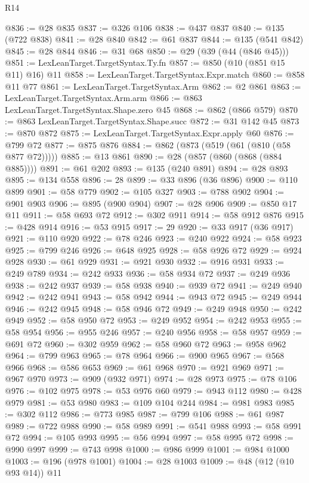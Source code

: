 \begin{lexlean}{R14}
\begin{coremodule}
@836 := @28 @835
@837 := @326 @106
@838 := @437 @837
@840 := @135 (@722 @838)
@841 := @28 @840
@842 := @61 @837
@844 := @135 (@541 @842)
@845 := @28 @844
@846 := @31 @68
@850 := @29 (@39 (@44 (@846 @45)))
@851 := LexLeanTarget.TargetSyntax.Ty.fn
@857 := @850 (@10 (@851 @15 @11) @16) @11
@858 := LexLeanTarget.TargetSyntax.Expr.match
@860 := @858 @11 @77
@861 := LexLeanTarget.TargetSyntax.Arm
@862 := @2 @861
@863 := LexLeanTarget.TargetSyntax.Arm.arm
@866 := @863 LexLeanTarget.TargetSyntax.Shape.zero @45
@868 := @862 (@866 @579)
@870 := @863 LexLeanTarget.TargetSyntax.Shape.succ
@872 := @31 @142 @45
@873 := @870 @872
@875 := LexLeanTarget.TargetSyntax.Expr.apply @60
@876 := @799 @72
@877 := @875 @876
@884 := @862 (@873 (@519 (@61 (@810 (@58 @877 @72)))))
@885 := @13 @861
@890 := @28 (@857 (@860 (@868 (@884 @885))))
@891 := @61 @202
@893 := @135 (@240 @891)
@894 := @28 @893
@895 := @134 @558
@896 := 28
@899 := @33 @896 (@36 @896)
@900 := @110 @899
@901 := @58 @779
@902 := @105 @327
@903 := @788 @902
@904 := @901 @903
@906 := @895 (@900 @904)
@907 := @28 @906
@909 := @850 @17 @11
@911 := @58 @693 @72
@912 := @302 @911
@914 := @58 @912 @876
@915 := @428 @914
@916 := @53 @915
@917 := 29
@920 := @33 @917 (@36 @917)
@921 := @110 @920
@922 := @78 @246
@923 := @240 @922
@924 := @58 @923
@925 := @799 @246
@926 := @648 @925
@928 := @58 @926 @72
@929 := @924 @928
@930 := @61 @929
@931 := @921 @930
@932 := @916 @931
@933 := @249 @789
@934 := @242 @933
@936 := @58 @934 @72
@937 := @249 @936
@938 := @242 @937
@939 := @58 @938
@940 := @939 @72
@941 := @249 @940
@942 := @242 @941
@943 := @58 @942
@944 := @943 @72
@945 := @249 @944
@946 := @242 @945
@948 := @58 @946 @72
@949 := @249 @948
@950 := @242 @949
@952 := @58 @950 @72
@953 := @249 @952
@954 := @242 @953
@955 := @58 @954
@956 := @955 @246
@957 := @240 @956
@958 := @58 @957
@959 := @691 @72
@960 := @302 @959
@962 := @58 @960 @72
@963 := @958 @962
@964 := @799 @963
@965 := @78 @964
@966 := @900 @965
@967 := @568 @966
@968 := @586 @653
@969 := @61 @968
@970 := @921 @969
@971 := @967 @970
@973 := @909 (@932 @971)
@974 := @28 @973
@975 := @78 @106
@976 := @102 @975
@978 := @53 @976 @60
@979 := @943 @112
@980 := @428 @979
@981 := @53 @980
@983 := @109 @104 @244
@984 := @981 @983
@985 := @302 @112
@986 := @773 @985
@987 := @799 @106
@988 := @61 @987
@989 := @722 @988
@990 := @58 @989
@991 := @541 @988
@993 := @58 @991 @72
@994 := @105 @993
@995 := @56 @994
@997 := @58 @995 @72
@998 := @990 @997
@999 := @743 @998
@1000 := @986 @999
@1001 := @984 @1000
@1003 := @196 (@978 @1001)
@1004 := @28 @1003
@1009 := @48 (@12 (@10 @93 @14)) @11

\end{coremodule}
\end{lexlean}
